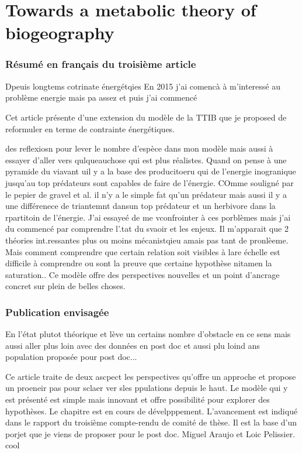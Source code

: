 \chapter{Towards a metabolic theory of biogeography}
\label{chap4}


\subsection{Résumé en français du troisième article}

Dpeuis longtems cotrinate énergétqies
En 2015 j'ai comencà à m'interessé au problème energie mais pa assez et puis j'ai commencé

Cet article présente d'une extension du modèle de la TTIB \citep{Gravel2011}
que je proposed de reformuler en terme de contrainte énergétiques.


des reflexiosn pour lever le nombre d'espèce dans mon modèle mais aussi à essayer d'aller vers qulqueauchose qui est plus réalistes.
Quand on pense à une pyramide du viavant uil y a la base des producitoeru qui de l'energie inogranique jusqu'au top prédateurs sont capables de faire de l'énergie.
COmme souligné par le pepier de gravel et al. il n'y a le simple fat qu'un prédateur mais aussi il y a une différenece de triantemnt dansun top prédateur et un herbivore dans la rpartitoin de l'énergie. J'ai essayeé de me vconfrointer à ces porblèmes mais j'ai du commencé par comprendre l'.tat du svaoir et les enjeux. Il m'apparait que 2 théories int.ressantes plus ou moins mécanistqieu amais pas tant de pronlèeme. Mais comment comprendre que certain relation soit visibles à lare échelle est difficile à comprendre ou sont la preuve que certaine hypothèse nitamen la saturation..
Ce modèle offre des perspectives nouvelles et un point d'ancrage concret sur plein de belles choses.



\subsection{Publication envisagée}

En l'état plutot théorique et lève un certains nombre d'obstacle en ce sens
mais aussi aller plus loin avec des données en post doc et aussi plu loind ans population
proposée pour post doc...

Ce article traite de deux ascpect les perspectives qu'offre un approche et propose un proeneir pas pour sclaer ver sles ppulations depuis le haut.
Le modèle qui y est présenté est simple mais innovant et offre possibilité pour explorer des hypothèses.
Le chapitre est en cours de dévelpppement. L'avancement est indiqué dans le rapport du troisième compte-rendu de comité de thèse.
Il est la base d'un porjet que je viens de proposer pour le post doc.
Miguel Araujo et Loic Pelissier. cool

